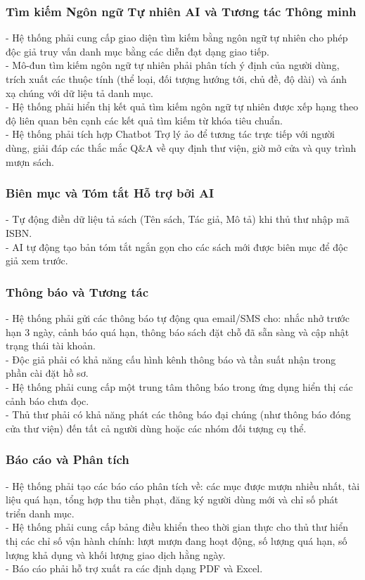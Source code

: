 \subsubsection{Tìm kiếm Ngôn ngữ Tự nhiên AI và Tương tác Thông minh}
- Hệ thống phải cung cấp giao diện tìm kiếm bằng ngôn ngữ tự nhiên cho phép độc giả truy vấn danh mục bằng các diễn đạt dạng giao tiếp.\\
- Mô-đun tìm kiếm ngôn ngữ tự nhiên phải phân tích ý định của người dùng, trích xuất các thuộc tính (thể loại, đối tượng hướng tới, chủ đề, độ dài) và ánh xạ chúng với dữ liệu tả danh mục.\\
- Hệ thống phải hiển thị kết quả tìm kiếm ngôn ngữ tự nhiên được xếp hạng theo độ liên quan bên cạnh các kết quả tìm kiếm từ khóa tiêu chuẩn.\\
- Hệ thống phải tích hợp Chatbot Trợ lý ảo để tương tác trực tiếp với người dùng, giải đáp các thắc mắc Q\&A về quy định thư viện, giờ mở cửa và quy trình mượn sách.\\

\subsubsection{Biên mục và Tóm tắt Hỗ trợ bởi AI}
- Tự động điền dữ liệu tả sách (Tên sách, Tác giả, Mô tả) khi thủ thư nhập mã ISBN.\\
- AI tự động tạo bản tóm tắt ngắn gọn cho các sách mới được biên mục để độc giả xem trước.\\

\subsubsection{Thông báo và Tương tác}
- Hệ thống phải gửi các thông báo tự động qua email/SMS cho: nhắc nhở trước hạn 3 ngày, cảnh báo quá hạn, thông báo sách đặt chỗ đã sẵn sàng và cập nhật trạng thái tài khoản.\\
- Độc giả phải có khả năng cấu hình kênh thông báo và tần suất nhận trong phần cài đặt hồ sơ.\\
- Hệ thống phải cung cấp một trung tâm thông báo trong ứng dụng hiển thị các cảnh báo chưa đọc.\\
- Thủ thư phải có khả năng phát các thông báo đại chúng (như thông báo đóng cửa thư viện) đến tất cả người dùng hoặc các nhóm đối tượng cụ thể.\\

\subsubsection{Báo cáo và Phân tích}
- Hệ thống phải tạo các báo cáo phân tích về: các mục được mượn nhiều nhất, tài liệu quá hạn, tổng hợp thu tiền phạt, đăng ký người dùng mới và chỉ số phát triển danh mục.\\
- Hệ thống phải cung cấp bảng điều khiển theo thời gian thực cho thủ thư hiển thị các chỉ số vận hành chính: lượt mượn đang hoạt động, số lượng quá hạn, số lượng khả dụng và khối lượng giao dịch hằng ngày.\\
- Báo cáo phải hỗ trợ xuất ra các định dạng PDF và Excel.\\

